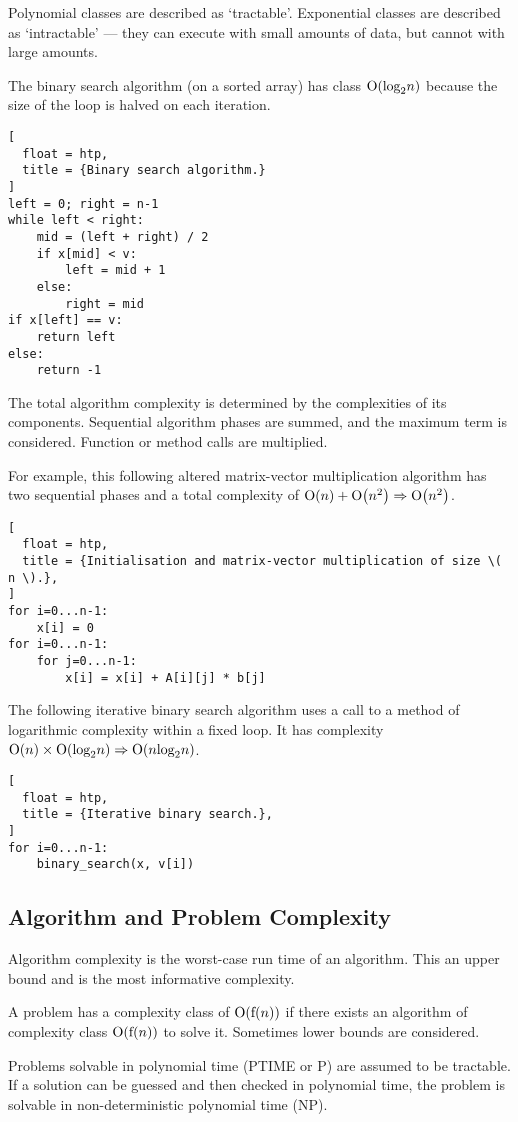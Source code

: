 Polynomial classes are described as `tractable'.
Exponential classes are described as `intractable' --- they can execute with small amounts of data, but cannot with large amounts.

The binary search algorithm (on a sorted array) has class \( \textup{O}\!\left( \textup{log}_2 n \right) \) because the size of the loop is halved on each iteration.

\begin{lstlisting}[
  float = htp,
  title = {Binary search algorithm.}
]
left = 0; right = n-1
while left < right:
    mid = (left + right) / 2
    if x[mid] < v:
        left = mid + 1
    else:
        right = mid
if x[left] == v:
    return left
else:
    return -1
\end{lstlisting}

The total algorithm complexity is determined by the complexities of its components.
Sequential algorithm phases are summed, and the maximum term is considered.
Function or method calls are multiplied.

For example, this following altered matrix-vector multiplication algorithm has two sequential phases and a total complexity of \( \textup{O}\!\left( n \right) + \textup{O}\!\left( n^2 \right) \Rightarrow \textup{O}\!\left( n^2 \right) \).

\begin{lstlisting}[
  float = htp,
  title = {Initialisation and matrix-vector multiplication of size \( n \).},
]
for i=0...n-1:
    x[i] = 0
for i=0...n-1:
    for j=0...n-1:
        x[i] = x[i] + A[i][j] * b[j]
\end{lstlisting}

The following iterative binary search algorithm uses a call to a method of logarithmic complexity within a fixed loop.
It has complexity \( \textup{O}\!\left( n \right) \times \textup{O}\!\left( \textup{log}_2 n \right) \Rightarrow \textup{O}\!\left( n \textup{log}_2 n \right) \).

\begin{lstlisting}[
  float = htp,
  title = {Iterative binary search.},
]
for i=0...n-1:
    binary_search(x, v[i])
\end{lstlisting}

\subsection{Algorithm and Problem Complexity}

Algorithm complexity is the worst-case run time of an algorithm.
This an upper bound and is the most informative complexity.

A problem has a complexity class of \( \textup{O}\!\left( \textup{f}\!\left( n \right) \right) \) if there exists an algorithm of complexity class \( \textup{O}\!\left( \textup{f}\!\left( n \right) \right) \) to solve it.
Sometimes lower bounds are considered.

Problems solvable in polynomial time (PTIME or P) are assumed to be tractable.
If a solution can be guessed and then checked in polynomial time, the problem is solvable in non-deterministic polynomial time (NP).
